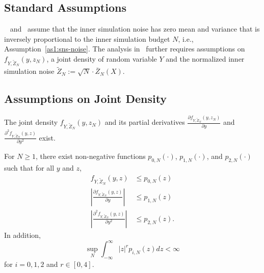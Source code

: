 \subsection{Standard Assumptions}
~\cite{gordy2010nested} and~\cite{broadie2015risk} assume that the inner simulation noise has zero mean and variance that is inversely proportional to the inner simulation budget $N$, i.e., Assumption~\ref{as1:sns-noise}.
The analysis in~\cite{gordy2010nested} further requires assumptions on $f_{Y,\tilde{Z}_N}(y,z_N)$, a joint density of random variable $Y$ and the normalized inner simulation noise $\tilde{Z}_N := \sqrt{N} \cdot\bar{Z}_N(X)$.

\subsection{Assumptions on Joint Density}

\begin{assumption} \label{as1:sns-joint-density}
    The joint density $f_{Y,\tilde{Z}_N}(y,z_N)$ and its partial derivatives 
    $\frac{\partial f_{Y,\tilde{Z}_N}(y,z_N)}{\partial y}$ and $\frac{\partial^2 f_{Y,\tilde{Z}_N}(y,z)}{\partial y^2}$ exist.
\end{assumption}

\begin{assumption} \label{as1:sns-joint-density-bound}
    For $N \geq 1$, there exist non-negative functions $p_{0, N}(\cdot)$, $p_{1, N}(\cdot)$, and $p_{2, N}(\cdot)$ such that for all $y$ and $z$,
    \begin{align*}
        f_{Y,\tilde{Z}_N}(y,z) & \leq p_{0, N}(z) \\
        \left| \frac{\partial f_{Y,\tilde{Z}_N}(y,z)}{\partial y} \right| & \leq p_{1, N}(z) \\
        \left| \frac{\partial^2 f_{Y,\tilde{Z}_N}(y,z)}{\partial y^2} \right| & \leq p_{2, N}(z).
    \end{align*}
    In addition, 
    \begin{equation}
        \sup_N \int_{-\infty}^{\infty} |z|^r p_{i, N}(z) dz < \infty
    \end{equation}
    for $i = 0, 1, 2$ and $r \in [0, 4]$.
\end{assumption}

